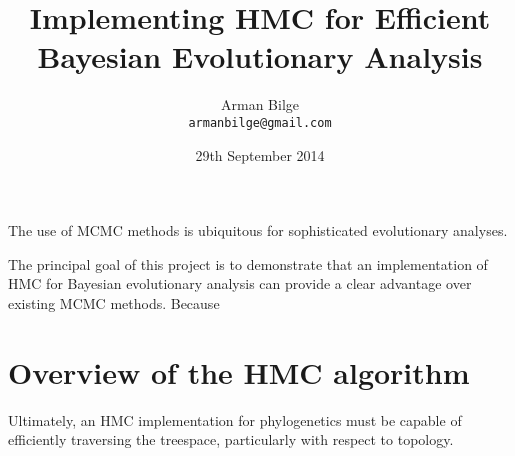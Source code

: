 \documentclass{article}
\title{Implementing \acl{HMC} for Efficient Bayesian Evolutionary Analysis}
\author{Arman Bilge \\ \texttt{armanbilge@gmail.com}}
\date{29th September 2014}
\begin{document}
    \maketitle

    The use of \ac{MCMC} methods is ubiquitous for sophisticated evolutionary
        analyses.

    The principal goal of this project is to demonstrate that an implementation
        of \ac{HMC} for Bayesian evolutionary analysis can provide a clear
        advantage over existing \ac{MCMC} methods.
    Because

    \section*{Overview of the \ac{HMC} algorithm}

    Ultimately, an \ac{HMC} implementation for phylogenetics must be capable of
        efficiently traversing the treespace, particularly with respect to
        topology.
\end{document}
